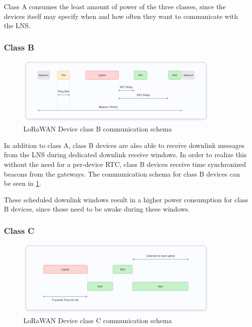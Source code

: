 Class A consumes the least amount of power of the three classes, since the devices itself may specify when and how often they want to communicate with the \ac{LNS}.

\subsubsection{Class B}

\begin{figure}[h]
    \centering
    \includegraphics[width=0.9\textwidth]{pictures/device-classes/class-b.png}
    \caption{\ac{LoRaWAN} Device class B communication schema~\protect\cite{the_things_network_device_nodate}}
    \label{pic:lorawan-device-class-b-schema}
\end{figure}

In addition to class A, class B devices are also able to receive downlink messages from the \ac{LNS} during dedicated downlink receive windows.
In order to realize this without the need for a per-device \ac{RTC}, class B devices receive time synchronized beacons from the gateways.
The communication schema for class B devices can be seen in \cref{pic:lorawan-device-class-b-schema}.

These scheduled downlink windows result in a higher power consumption for class B devices, since those need to be awake during these windows.

\subsubsection{Class C}

\begin{figure}[h]
    \centering
    \includegraphics[width=0.9\textwidth]{pictures/device-classes/class-c.png}
    \caption{\ac{LoRaWAN} Device class C communication schema~\protect\cite{the_things_network_device_nodate}}
    \label{pic:lorawan-device-class-c-schema}
\end{figure}

